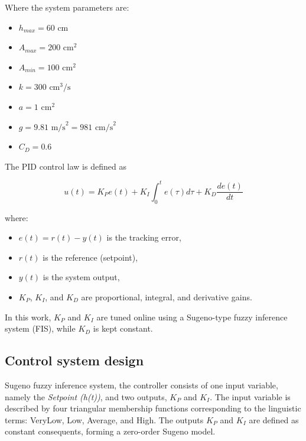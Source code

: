 Where the system parameters are:
\begin{itemize}
	\item $h_{max} = 60 \text{ cm}$
	\item $A_{max} = 200 \text{ cm}^2$
	\item $A_{min} = 100 \text{ cm}^2$
	\item $k = 300 \text{ cm}^3/\text{s}$
	\item $a = 1 \text{ cm}^2$
	\item $g = 9.81 \text{ m/s}^2 = 981 \text{ cm/s}^2$
	\item $C_D = 0.6$
\end{itemize}

The PID control law is defined as

\begin{equation}
	u(t) = K_P e(t) + K_I \int_0^t e(\tau)d\tau + K_D \frac{de(t)}{dt}
\end{equation}

where:
\begin{itemize}
	\item $e(t) = r(t) - y(t)$ is the tracking error,
	\item $r(t)$ is the reference (setpoint),
	\item $y(t)$ is the system output,
	\item $K_P$, $K_I$, and $K_D$ are proportional, integral, and derivative gains.
\end{itemize}

In this work, $K_P$ and $K_I$ are tuned online using a Sugeno-type fuzzy inference system (FIS), while $K_D$ is kept constant.

\subsection{Control system design}

Sugeno fuzzy inference system, the controller consists of one input variable, namely the \textit{Setpoint (h(t))}, and two outputs, $K_P$ and $K_I$. The input variable is described by four triangular membership functions corresponding to the linguistic terms: VeryLow, Low, Average, and High. The outputs $K_P$ and $K_I$ are defined as constant consequents, forming a zero-order Sugeno model.

